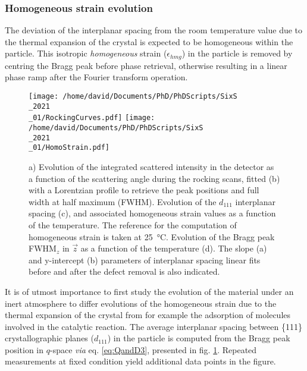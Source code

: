 \subsubsection{Homogeneous strain evolution}

The deviation of the interplanar spacing from the room temperature value due to the thermal expansion of the crystal is expected to be homogeneous within the particle.
This isotropic \textit{homogeneous} strain ($\epsilon_{hmg}$) in the particle is removed by centring the Bragg peak before phase retrieval, otherwise resulting in a linear phase ramp after the Fourier transform operation.


\begin{figure}[!htb]
    \centering
    \texttt{[image: /home/david/Documents/PhD/PhDScripts/SixS\\\_2021\\\_01/RockingCurves.pdf]}
    \texttt{[image: /home/david/Documents/PhD/PhDScripts/SixS\\\_2021\\\_01/HomoStrain.pdf]}
    \caption{
        a) Evolution of the integrated scattered intensity in the detector as a function of the scattering angle during the rocking scans, fitted (b) with a Lorentzian profile to retrieve the peak positions and full width at half maximum (FWHM).
        Evolution of the $d_{111}$ interplanar spacing (c), and associated homogeneous strain values as a function of the temperature.
        The reference for the computation of homogeneous strain is taken at \qty{25}{\degreeCelsius}.
        Evolution of the Bragg peak FWHM$_z$ in $\vec{z}$ as a function of the temperature (d).
        The slope (a) and y-intercept (b) parameters of interplanar spacing linear fits before and after the defect removal is also indicated.
    }
    \label{fig:AmaterasuHomoStrain}
\end{figure}

It is of utmost importance to first study the evolution of the material under an inert atmosphere to differ evolutions of the homogeneous strain due to the thermal expansion of the crystal from for example the adsorption of molecules involved in the catalytic reaction.
The average interplanar spacing between \{111\} crystallographic planes ($d_{111}$) in the particle is computed from the Bragg peak position in $q$-space \textit{via} eq. \ref{eq:QandD3}, presented in fig. \ref{fig:AmaterasuHomoStrain}.
Repeated measurements at fixed condition yield additional data points in the figure.

